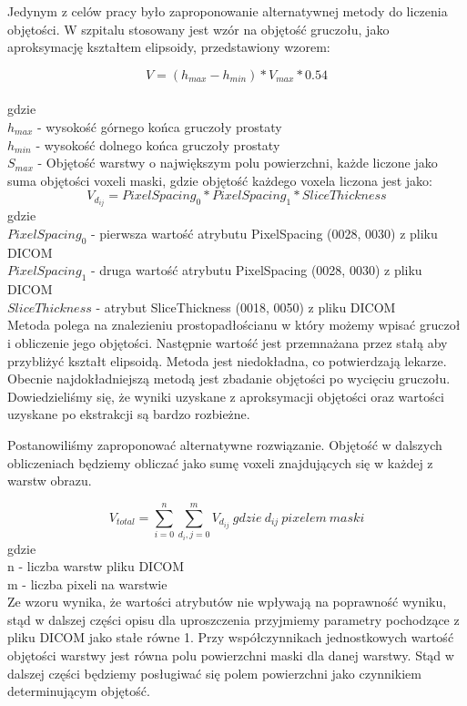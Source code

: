 \documentclass[a4paper,11pt,twoside]{report}
\theoremstyle{definition}
\begin{document}
Jedynym z celów pracy było zaproponowanie alternatywnej metody do liczenia objętości. W szpitalu stosowany jest wzór na objętość gruczołu, jako aproksymację kształtem elipsoidy, przedstawiony wzorem:

\[V = (h_{max} - h_{min}) * V_{max} * 0.54\]
\\
gdzie 
\\
\(h_{max}\) - wysokość górnego końca gruczoły prostaty                     
\\
\(h_{min}\) - wysokość dolnego końca gruczoły prostaty                     
\\
\(S_{max}\) - Objętość warstwy o największym polu powierzchni, każde liczone jako suma objętości voxeli maski, gdzie objętość każdego voxela liczona jest jako:
\[ V_{d_{ij}} = PixelSpacing_0 * PixelSpacing_1 * SliceThickness\]
gdzie \\
\(PixelSpacing_0\) - pierwsza wartość atrybutu PixelSpacing (0028, 0030) z pliku DICOM \\
\(PixelSpacing_1\)  - druga wartość atrybutu PixelSpacing (0028, 0030) z pliku DICOM \\
\(SliceThickness\) - atrybut SliceThickness (0018, 0050) z pliku DICOM \\

Metoda polega na znalezieniu prostopadłościanu w który możemy wpisać gruczoł i obliczenie jego objętości. Następnie wartość jest przemnażana przez stałą aby przybliżyć kształt elipsoidą. Metoda jest niedokładna, co potwierdzają lekarze. Obecnie najdokładniejszą metodą jest zbadanie objętości po wycięciu gruczołu. Dowiedzieliśmy się, że wyniki uzyskane z aproksymacji objętości oraz wartości uzyskane po ekstrakcji są bardzo rozbieżne. 
\par
Postanowiliśmy zaproponować alternatywne rozwiązanie. Objętość w dalszych obliczeniach będziemy obliczać jako sumę voxeli znajdujących się w każdej z warstw obrazu. 

\[ V_{total} = \sum_{i=0}^{n} \sum_{d_i, j=0}^{m} V_{d_{ij}} \ gdzie\ d_{ij}\ pixelem\ maski \]
gdzie \\
n - liczba warstw pliku DICOM \\
m - liczba pixeli na warstwie \\

Ze wzoru wynika, że wartości atrybutów nie wpływają na poprawność wyniku, stąd w dalszej części opisu dla uproszczenia przyjmiemy parametry pochodzące z pliku DICOM jako stałe równe 1. Przy współczynnikach jednostkowych wartość objętości warstwy jest równa polu powierzchni maski dla danej warstwy. Stąd w dalszej części będziemy posługiwać się polem powierzchni jako czynnikiem determinującym objętość.
\end{document}
